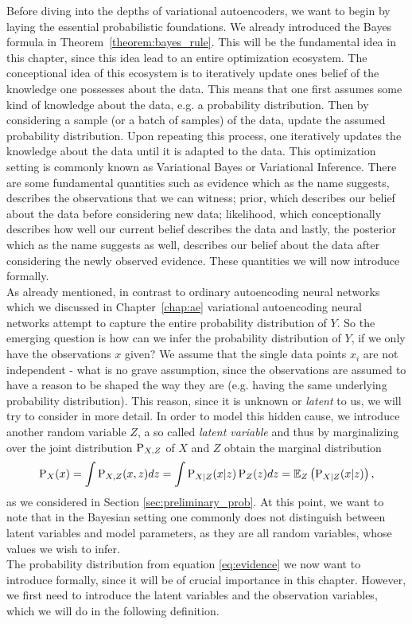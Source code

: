 Before diving into the depths of variational autoencoders, we want to begin by laying the essential probabilistic foundations. We already introduced the Bayes formula in Theorem~\ref{theorem:bayes_rule}. This will be the fundamental idea in this chapter, since this idea lead to an entire optimization ecosystem. The conceptional idea of this ecosystem is to iteratively update ones belief of the knowledge one possesses about the data. This means that one first assumes some kind of knowledge about the data, e.g. a probability distribution. Then by considering a sample (or a batch of samples) of the data, update the assumed probability distribution. Upon repeating this process, one iteratively updates the knowledge about the data until it is adapted to the data. This optimization setting is commonly known as Variational Bayes or Variational Inference. There are some fundamental quantities such as evidence which as the name suggests, describes the observations that we can witness; prior, which describes our belief about the data before considering new data; likelihood, which conceptionally describes how well our current belief describes the data and lastly, the posterior which as the name suggests as well, describes our belief about the data after considering the newly observed evidence. These quantities we will now introduce formally.\\
As already mentioned, in contrast to ordinary autoencoding neural networks which we discussed in Chapter~\ref{chap:ae} variational autoencoding neural networks attempt to capture the entire probability distribution of $Y$. So the emerging question is how can we infer the probability distribution of $Y$, if we only have the observations $x$ given? We assume that the single data points $x_i$ are not independent - what is no grave assumption, since the observations are assumed to have a reason to be shaped the way they are (e.g. having the same underlying probability distribution). This reason, since it is unknown or \textit{latent} to us, we will try to consider in more detail. In order to model this hidden cause, we introduce another random variable $Z$, a so called \textit{latent variable} and thus by marginalizing over the joint distribution $\operatorname{\text{P}}_{X, Z}$ of $X$ and $Z$ obtain the marginal distribution
\begin{align}\label{eq:evidence}
\operatorname{\text{P}}_X(x) = \int \operatorname{\text{P}}_{X,Z}(x,z) dz = \int \operatorname{\text{P}}_{X|Z}(x|z)\operatorname{\text{P}}_{Z}(z)dz = \operatorname{\mathbb{E}}_Z \left( \operatorname{\text{P}}_{X|Z}(x|z) \right),
\end{align}
as we considered in Section \ref{sec:preliminary_prob}. At this point, we want to note that in the Bayesian setting one commonly does not distinguish between latent variables and model parameters, as they are all random variables, whose values we wish to infer.\\
The probability distribution from equation \eqref{eq:evidence} we now want to introduce formally, since it will be of crucial importance in this chapter. However, we first need to introduce the latent variables and the observation variables, which we will do in the following definition.

